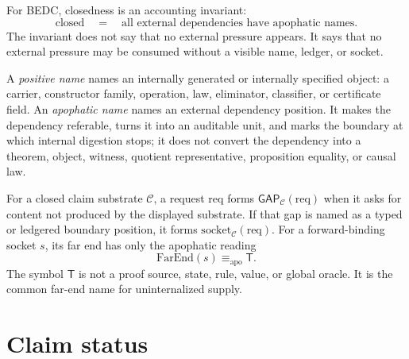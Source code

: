 \begin{principle}
\label{prin:closedness-as-named-externality}
For BEDC, closedness is an accounting invariant:
$$
\text{closed}
\quad = \quad
\text{all external dependencies have apophatic names}.
$$
The invariant does not say that no external pressure appears.  It says that
no external pressure may be consumed without a visible name, ledger, or
socket.
\end{principle}

\begin{definition}
\label{def:positive-and-apophatic-names}
A \emph{positive name} names an internally generated or internally specified
object: a carrier, constructor family, operation, law, eliminator,
classifier, or certificate field.  An \emph{apophatic name} names an
external dependency position.  It makes the dependency referable, turns it
into an auditable unit, and marks the boundary at which internal digestion
stops; it does not convert the dependency into a theorem, object, witness,
quotient representative, proposition equality, or causal law.
\end{definition}

\begin{definition}
\label{def:claim-gap-socket-far-end}
For a closed claim substrate $\mathcal C$, a request $\mathrm{req}$ forms
$\mathsf{GAP}_{\mathcal C}(\mathrm{req})$ when it asks for content not
produced by the displayed substrate.  If that gap is named as a typed or
ledgered boundary position, it forms
$\mathrm{socket}_{\mathcal C}(\mathrm{req})$.  For a forward-binding socket
$s$, its far end has only the apophatic reading
$$
\mathrm{FarEnd}(s) \equiv_{\mathrm{apo}} \mathsf{T}.
$$
The symbol $\mathsf{T}$ is not a proof source, state, rule, value, or global
oracle.  It is the common far-end name for uninternalized supply.
\end{definition}

\section{Claim status}
\label{sec:legitimate-claim-status}

